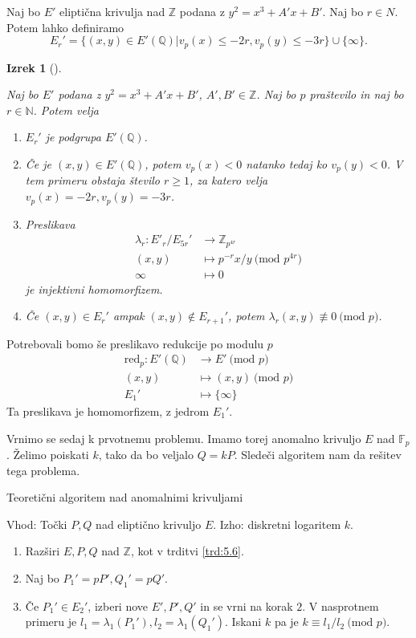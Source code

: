 \documentclass[12pt,a4paper,twoside]{article}
\theoremstyle{definition} %
\theoremstyle{plain} %
\newtheorem{izrek}[definicija]{Izrek}
\numberwithin{equation}{section}  %
\newcommand{\N}{\mathbb N}
\newcommand{\Z}{\mathbb Z}
\newcommand{\Q}{\mathbb Q}
\newcommand{\F}{\mathbb F}
\newcommand{\MOD}[1]{\ \text{(mod }{#1}\text{)}}
\begin{document}
Naj bo $E'$ eliptična krivulja nad $\Z$ podana z $y^2 = x^3+A'x+B'$. Naj bo $r \in N$. Potem lahko definiramo
$$E_r' = \{  (x,y) \in E'(\Q) | v_p(x) \leq -2r, v_p(y) \leq -3r \} \cup \{ \infty \}.$$

\begin{izrek}[]~

Naj bo $E'$ podana z $y^2 = x^3+A'x+B'$, $A',B' \in \Z$. Naj bo $p$ praštevilo in naj bo $r \in \N$. Potem velja
\begin{enumerate}

\item $E_r'$ je podgrupa $E'(\Q)$.
\item Če je $(x,y) \in E'(\Q)$, potem $v_p(x)<0$ natanko tedaj ko $v_p(y) <0$. V tem primeru obstaja število $r \geq 1$, za katero velja $v_p(x) = -2r, v_p(y) = -3r$.
\item Preslikava
\begin{align}
\lambda_r: E'_r/E_{5r}' &{}\rightarrow \Z_{p^{4r}} \nonumber \\
(x,y) &{}\mapsto p^{-r}x/y \MOD{p^{4r}} \nonumber \\
\infty &{}\mapsto 0 \nonumber
\end{align}
je injektivni homomorfizem.
\item Če $(x,y) \in E_r'$ ampak $(x,y) \not \in E_{r+1}'$, potem $\lambda_r(x,y) \not \equiv 0 \MOD{p}$.

\end{enumerate}
\end{izrek}

Potrebovali bomo še preslikavo redukcije po modulu $p$
\begin{align}
\text{red}_p: E'(\Q) &{}\rightarrow E' \MOD{p} \nonumber \\
(x,y) &{}\mapsto (x,y) \MOD{p} \nonumber \\
E_1' &{}\mapsto \{ \infty \} \nonumber
\end{align}
Ta preslikava je homomorfizem, z jedrom $E_1'$.

Vrnimo se sedaj k prvotnemu problemu. Imamo torej anomalno krivuljo $E$ nad $\F_p$. Želimo poiskati $k$, tako da bo veljalo $Q = kP$. Sledeči algoritem nam da rešitev tega problema.

\begin{algorithm}[H]
\caption[AN]{Teoretični algoritem nad anomalnimi krivuljami}
\label{alg:Anomal}
Vhod: Točki $P, Q$ nad eliptično krivuljo $E$.\newline
Izho: diskretni logaritem $k$.\newline
\begin{enumerate}
\item Razširi $E,P,Q$ nad $\Z$, kot v trditvi \ref{trd:5.6}.
\item Naj bo $P_1' = pP',Q_1' = pQ'$.
\item Če $P_1' \in E_2'$, izberi nove $E',P',Q'$ in se vrni na korak $2$. V nasprotnem primeru je $l_1 = \lambda_1(P_1'),l_2 = \lambda_1(Q_1')$. Iskani $k$ pa je $k \equiv l_1/l_2 \MOD{p}$.
\end{enumerate}

\end{algorithm}
\end{document}
